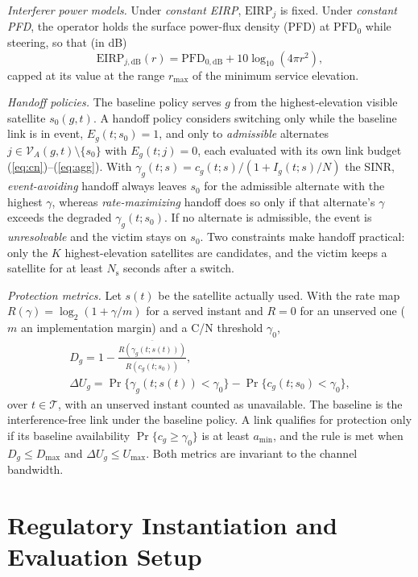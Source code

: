 \documentclass[conference]{IEEEtran}
\begin{document}
\emph{Interferer power models.} Under \emph{constant EIRP}, $\mathrm{EIRP}_j$ is
fixed. Under \emph{constant PFD}, the operator holds the surface power-flux
density (PFD) at $\mathrm{PFD}_0$ while steering, so that (in dB)
\begin{equation}
\mathrm{EIRP}_{j,\text{dB}}(r) = \mathrm{PFD}_{0,\text{dB}} + 10\log_{10}(4\pi r^2),
\label{eq:pfd}
\end{equation}
capped at its value at the range $r_{\max}$ of the minimum service elevation.

\emph{Handoff policies.} The baseline policy serves $g$ from the highest-elevation
visible satellite $s_0(g,t)$. A handoff policy considers switching only while the
baseline link is in event, $E_g(t;s_0)=1$, and only to \emph{admissible}
alternates $j \in \mathcal{V}_A(g,t)\setminus\{s_0\}$ with $E_g(t;j)=0$, each
evaluated with its own link budget (\ref{eq:cn})--(\ref{eq:agg}). With
$\gamma_g(t;s) = c_g(t;s)/(1+I_g(t;s)/N)$ the SINR,
\emph{event-avoiding} handoff always leaves $s_0$ for the admissible alternate
with the highest $\gamma$, whereas \emph{rate-maximizing} handoff does so only if
that alternate's $\gamma$ exceeds the degraded $\gamma_g(t;s_0)$. If no alternate
is admissible, the event is \emph{unresolvable} and the victim stays on $s_0$.
Two constraints make handoff practical: only the $K$ highest-elevation satellites
are candidates, and the victim keeps a satellite for at least $N_{\text{s}}$
seconds after a switch.

\emph{Protection metrics.} Let $s(t)$ be the satellite actually used. With the
rate map $R(\gamma) = \log_2(1+\gamma/m)$ for a served instant and $R=0$ for an
unserved one ($m$ an implementation margin) and a C/N threshold $\gamma_0$,
\begin{gather}
D_g = 1 - \frac{\overline{R(\gamma_g(t;s(t)))}}{\overline{R(c_g(t;s_0))}},\\
\Delta U_g = \Pr\{\gamma_g(t;s(t)) < \gamma_0\} - \Pr\{c_g(t;s_0) < \gamma_0\},
\label{eq:metrics}
\end{gather}
over $t\in\mathcal{T}$, with an unserved instant counted as unavailable. The
baseline is the interference-free link under the baseline policy. A link
qualifies for protection only if its baseline availability
$\Pr\{c_g \ge \gamma_0\}$ is at least $a_{\min}$, and the rule is met when
$D_g \le D_{\max}$ and $\Delta U_g \le U_{\max}$. Both metrics are invariant to the
channel bandwidth.

\section{Regulatory Instantiation and Evaluation Setup}
\label{sec:setup}
\end{document}

